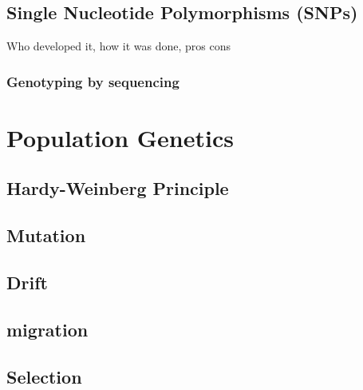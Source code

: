 \documentclass{report}\usepackage[]{graphicx}\usepackage[]{color}
\begin{document}
\section{Single Nucleotide Polymorphisms (SNPs)}
Who developed it, how it was done, pros cons

\subsection{Genotyping by sequencing}




\chapter{Population Genetics}
\section{Hardy-Weinberg Principle}
\section{Mutation}
\section{Drift}
\section{migration}
\section{Selection}
\end{document}

